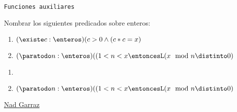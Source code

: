 \texttt{Funciones auxiliares}\bigskip

\begin{enunciado}{\ejercicio}
  Nombrar los siguientes predicados sobre enteros:
  \begin{enumerate}[label=\alph*)]
    \item {}
          {$(\existe c : \enteros)(c > 0 \land (c * c = x)$}

    \item {}
          {$(\paratodo n : \enteros)((1<n<x \entoncesL (x \mod n \distinto 0)$}
  \end{enumerate}
\end{enunciado}

\begin{enumerate}[label=\alph*)]
  \item {}

  \item {}
        {$(\paratodo n : \enteros)((1 < n <x
                \entoncesL
                (x \mod n \distinto 0)$}
\end{enumerate}

\begin{aportes}
  \item \href{\dirRepo}{Nad Garraz \github}
\end{aportes}

